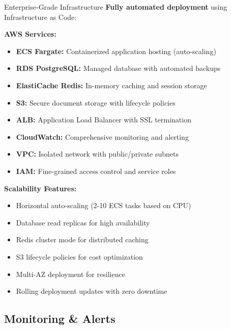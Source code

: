 \documentclass[11pt,a4paper]{article}
\begin{document}
\begin{featurebox}{Enterprise-Grade Infrastructure}
    \textbf{Fully automated deployment} using Infrastructure as Code:

    \vspace{0.5cm}
    \textbf{AWS Services:}
    \begin{itemize}[itemsep=0.3em]
        \item \textbf{ECS Fargate:} Containerized application hosting (auto-scaling)
        \item \textbf{RDS PostgreSQL:} Managed database with automated backups
        \item \textbf{ElastiCache Redis:} In-memory caching and session storage
        \item \textbf{S3:} Secure document storage with lifecycle policies
        \item \textbf{ALB:} Application Load Balancer with SSL termination
        \item \textbf{CloudWatch:} Comprehensive monitoring and alerting
        \item \textbf{VPC:} Isolated network with public/private subnets
        \item \textbf{IAM:} Fine-grained access control and service roles
    \end{itemize}

    \vspace{0.5cm}
    \textbf{Scalability Features:}
    \begin{itemize}[itemsep=0.2em]
        \item Horizontal auto-scaling (2-10 ECS tasks based on CPU)
        \item Database read replicas for high availability
        \item Redis cluster mode for distributed caching
        \item S3 lifecycle policies for cost optimization
        \item Multi-AZ deployment for resilience
        \item Rolling deployment updates with zero downtime
    \end{itemize}
\end{featurebox}

\subsection{Monitoring \& Alerts}
\end{document}

